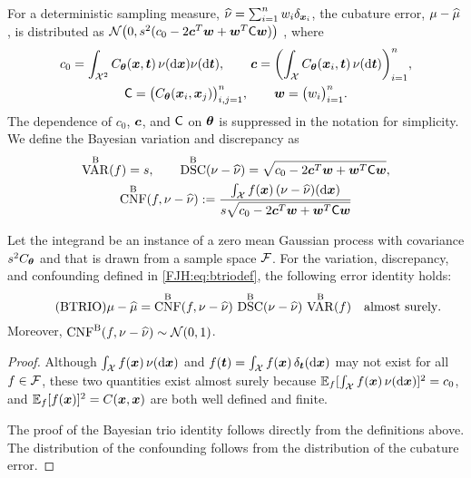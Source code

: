 \documentclass[graybox,footinfo]{svmult}
\DeclareMathOperator{\algn}{CNF}
\DeclareMathOperator{\disc}{DSC}
\DeclareMathOperator{\Var}{VAR}
\begin{document}
For a 
deterministic sampling measure, $\widehat{\nu} = \sum_{i=1}^n w_i \delta_{{\boldsymbol{x}}_i}$, the cubature 
error, $\mu - \widehat{\mu}$, is distributed as $\mathcal{N} \bigl(0 , s^2(c_0 - 
2 {\boldsymbol{c}}^T {\boldsymbol{w}} + {\boldsymbol{w}} ^T \mathsf{C} {\boldsymbol{w}}) \bigr)$ \cite{??}, where 
\begin{subequations} \label{FJH:eq:Cvecmatdef}
\begin{gather}
c_0  = \int_{{\mathcal{X}}^2} C_{\boldsymbol{\theta}}({\boldsymbol{x}},{\boldsymbol{t}}) \, \nu(\mathrm{d} {\boldsymbol{x}}) \nu(\mathrm{d} {\boldsymbol{t}}), \qquad {\boldsymbol{c}} = 
\biggl( 
\int_{\mathcal{X}} 
C_{\boldsymbol{\theta}}({\boldsymbol{x}}_i,{\boldsymbol{t}}) \,\nu(\mathrm{d} {\boldsymbol{t}}) \biggr)_{i=1}^n, \\
\mathsf{C}  = \bigl( C_{\boldsymbol{\theta}}({\boldsymbol{x}}_i,{\boldsymbol{x}}_j) \bigr)_{i,j=1}^n, \qquad {\boldsymbol{w}} = \bigl(w_i 
\bigr)_{i=1}^n.
\end{gather}
\end{subequations}
The dependence of $c_0$, ${\boldsymbol{c}}$, and $\mathsf{C}$ on ${\boldsymbol{\theta}}$ is suppressed in the 
notation for simplicity. We 
define the Bayesian variation and discrepancy as 
\begin{subequations} \label{FJH:eq:btriodef}
\begin{gather}
\label{FJH:eq:btriodefa}
\Var^{\Ba}(f)  = s, \qquad \disc^{\Ba}(\nu - \hnu) = \sqrt{c_0 - 
	2 \bsc^T \bsw + \bsw ^T \mC \bsw},\\
\algn^{\Ba}(f,\nu - \hnu) :=\frac{ \int_{\cx} 
	f(\bsx) \, (\nu - \hnu)(\D\bsx)}{s \sqrt{c_0 - 2 \bsc^T \bsw + \bsw ^T \mC \bsw}}
\end{gather}
\end{subequations}

\begin{theorem}  \label{FJH:thm:btrio} Let the integrand be 
an instance of a zero mean Gaussian process with covariance $s^2C_{{\boldsymbol{\theta}}}$ and 
that is drawn from a sample space 
${\mathcal{F}}$.  For the  variation, discrepancy, and 
	confounding defined in \eqref{FJH:eq:btriodef}, the following error identity holds: 
	\begin{equation} \tag{BTRIO} \label{FJH:eq:btrio}
	\mu - \hmu  = \algn^\Ba(f,\nu - \hnu) \, \disc^\Ba(\nu - \hnu) \, \Var^{\Ba}(f) \quad 
	\text{almost surely}.
	\end{equation}
	Moreover, $\algn^\Ba(f,\nu - \hnu) \sim \cn(0,1)$. 
\end{theorem}
\begin{proof}  Although $\int_{\mathcal{X}} f({\boldsymbol{x}}) \, \nu(\mathrm{d} {\boldsymbol{x}})$ and $f({\boldsymbol{t}}) = \int_{\mathcal{X}} 
f({\boldsymbol{x}}) \, \delta_{\boldsymbol{t}} (\mathrm{d} {\boldsymbol{x}})$ may not exist for all $f \in \mathcal{F}$, these two quantities exist 
almost surely because ${\mathbb{E}}_f [\int_{\mathcal{X}} f({\boldsymbol{x}}) \, \nu(\mathrm{d} {\boldsymbol{x}})]^2 = c_0$, and 
${\mathbb{E}}_f [f({\boldsymbol{x}})]^2 = C({\boldsymbol{x}},{\boldsymbol{x}})$ are both well defined and finite.

The proof of the Bayesian trio identity follows directly from the definitions above.  The 
distribution of the confounding follows from the distribution of the cubature error.
\end{proof}
\end{document}
